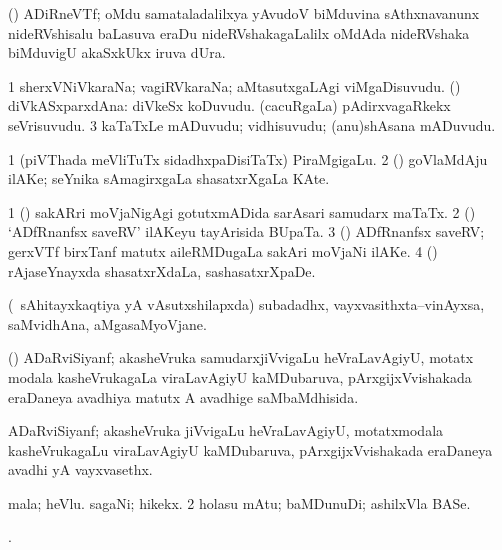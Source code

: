 \bentry
{}
\gl{\nA}
\bmng
(\jAyx) ADiRneVTf; oMdu samataladalilxya yAvudoV biMduvina sAthxnavanunx nideRVshisalu baLasuva eraDu nideRVshakagaLalilx oMdAda nideRVshaka biMduvigU akaSxkUkx iruva dUra. 
\emng
\eentry

\bentry
{}
\gl{\nA}
\bmng
\bnum
\num{1} sherxVNiVkaraNa; vagiRVkaraNa; aMtasutxgaLAgi viMgaDisuvudu. 
 (\kerxY) diVkASxparxdAna: 
\banum
{} diVkeSx koDuvudu. 
 (cacuRgaLa) pAdirxvagaRkekx seVrisuvudu. 
\eanum
\numie
\num{3} kaTaTxLe mADuvudu; vidhisuvudu; (anu)shAsana mADuvudu. 
\enum
\emng
\eentry

\bentry
{}
\gl{\nA}
\bmng
\bnum
\num{1} (piVThada meVliTuTx sidadhxpaDisiTaTx) PiraMgigaLu. 
\num{2} (\birx) goVlaMdAju ilAKe; seYnika sAmagirxgaLa shasatxrXgaLa KAte. 
\enum
\emng

\noindent
\gl{\pagu}
\bmng
\bnum
\num{1}  (\birx) sakARri moVjaNigAgi gotutxmADida sarAsari samudarx maTaTx. 
\num{2}  (\birx) `ADfRnanfsx saveRV' ilAKeyu tayArisida BUpaTa. 
\num{3}  (\birx) ADfRnanfsx saveRV; gerxVTf birxTanf matutx aileRMDugaLa sakAri moVjaNi ilAKe. 
\num{4}  (\birx) rAjaseYnayxda shasatxrXdaLa, sashasatxrXpaDe. 
\enum
\emng
\eentry

\bentry
{}
\gl{\nA}
\bmng
(\kanmu\ sAhitayxkaqtiya yA vAsutxshilapxda) subadadhx, vayxvasithxta--vinAyxsa, saMvidhAna, aMgasaMyoVjane. 
\emng
\eentry

\bentry
{}
\gl{\gu}
\bmng
(\BUvi) ADaRviSiyanf; akasheVruka samudarxjiVvigaLu heVraLavAgiyU, motatx modala kasheVrukagaLa viraLavAgiyU kaMDubaruva, pArxgijxVvishakada eraDaneya avadhiya matutx A avadhige saMbaMdhisida. 
\emng
\eentry

\bentry
{}
\gl{\nA}
\bmng
ADaRviSiyanf; akasheVruka jiVvigaLu heVraLavAgiyU, motatxmodala kasheVrukagaLu viraLavAgiyU kaMDubaruva, pArxgijxVvishakada eraDaneya avadhi yA vayxvasethx. 
\emng
\eentry

\bentry
{}
\gl{\nA}
\bmng
\bnum
{} 
\banum
{} mala; heVlu. 
 sagaNi; hikekx. 
\eanum
\numie
\num{2} holasu mAtu; baMDunuDi; ashilxVla BASe. 
\enum
\emng
\eentry

\bentry
{}
\gl{\saMkiSx}
\bmng
{}. 
\emng
\eentry

